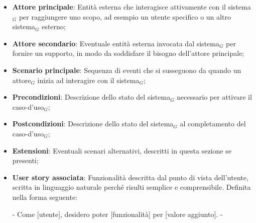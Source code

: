 \documentclass[10pt]{article}
\begin{document}
\begin{justify}
\begin{itemize}
            \item \textbf{Attore principale}: Entità esterna che interagisce attivamente con il sistema$_G$ per raggiungere uno scopo, ad esempio un utente specifico o un altro sistema$_G$ esterno;
            \item \textbf{Attore secondario}: Eventuale entità esterna invocata dal sistema$_G$ per fornire un supporto, in modo da soddisfare il bisogno dell'attore principale;
            \item \textbf{Scenario principale}: Sequenza di eventi che si susseguono da quando un attore$_G$ inizia ad interagire con il sistema$_G$;
            \item \textbf{Precondizioni}: Descrizione dello stato del sistema$_G$ necessario per attivare il caso-d'uso$_G$;
            \item \textbf{Postcondizioni}: Descrizione dello stato del sistema$_G$ al completamento del caso-d'uso$_G$;
            \item \textbf{Estensioni}: Eventuali scenari alternativi, descritti in questa sezione se presenti;
            \item \textbf{User story associata}: Funzionalità descritta dal punto di vista dell'utente, scritta in linguaggio naturale perché risulti semplice e comprensibile. Definita nella forma seguente: \newline
            \vspace{-5mm}
            \begin{center}
                - Come [utente], desidero poter [funzionalità] per [valore aggiunto]. -
            \end{center} 
        \end{itemize}


\end{justify}
\end{document}
